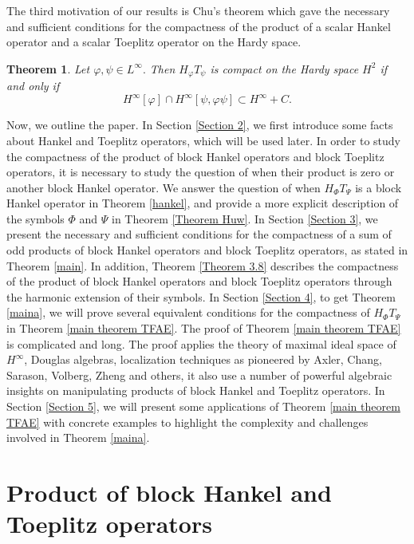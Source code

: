\documentclass{article}%
\newtheorem{theorem}{Theorem}[section]
\begin{document}
The third motivation of our results is Chu's theorem \cite{ChengChu15} which
gave the necessary and sufficient conditions for the compactness of the
product of a scalar Hankel operator and a scalar Toeplitz operator on the
Hardy space.

\begin{theorem}
\label{ChengChu15} \cite{ChengChu15} Let $\varphi,\psi\in L^{\infty}.$ Then
$H_{\varphi}T_{\psi}$ is compact on the Hardy space $H^{2}$ if and only if%
\[
H^{\infty}[\varphi]\cap H^{\infty}[\psi,\varphi\psi]\subset H^{\infty}+C.
\]

\end{theorem}

Now, we outline the paper. In Section \ref{Section 2}, we first introduce some
facts about Hankel and Toeplitz operators, which will be used later. In order
to study the compactness of the product of block Hankel operators and block
Toeplitz operators, it is necessary to study the question of when their
product is zero or another block Hankel operator. We answer the question of
when $H_{\Phi}T_{\Psi}$ is a block Hankel operator in Theorem \ref{hankel},
and provide a more explicit description of the symbols $\Phi$ and $\Psi$ in
Theorem \ref{Theorem Huw}. In Section \ref{Section 3}, we present the
necessary and sufficient conditions for the compactness of a sum of odd
products of block Hankel operators and block Toeplitz operators, as stated in
Theorem \ref{main}. In addition, Theorem \ref{Theorem 3.8} describes the
compactness of the product of block Hankel operators and block Toeplitz
operators through the harmonic extension of their symbols. In Section
\ref{Section 4}, to get Theorem \ref{maina}, we will prove several equivalent
conditions for the compactness of $H_{\Phi}T_{\Psi}$ in Theorem
\ref{main theorem TFAE}. The proof of Theorem \ref{main theorem TFAE} is
complicated and long. The proof applies the theory of maximal ideal space of
$H^{\infty}$, Douglas algebras, localization techniques as pioneered by Axler,
Chang, Sarason, Volberg, Zheng and others, it also use a number of powerful
algebraic insights on manipulating products of block Hankel and Toeplitz
operators. In Section \ref{Section 5}, we will present some applications of
Theorem \ref{main theorem TFAE} with concrete examples to highlight the
complexity and challenges involved in Theorem \ref{maina}.

\section{Product of block Hankel and Toeplitz operators}
\end{document}
